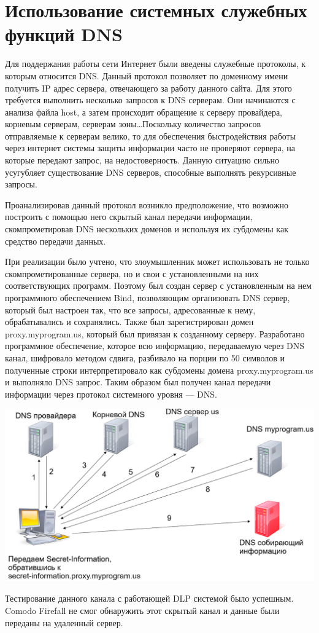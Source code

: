 \section{Использование системных служебных функций DNS}

Для поддержания работы сети Интернет были введены служебные протоколы, к которым относится DNS. Данный протокол позволяет по доменному имени получить IP адрес сервера, отвечающего за работу данного сайта. Для этого требуется выполнить несколько запросов к DNS серверам. Они начинаются с анализа файла host, а затем происходит обращение к серверу провайдера, корневым серверам, серверам зоны\dots Поскольку количество запросов отправляемые к серверам велико, то для обеспечения быстродействия работы через интернет системы защиты информации часто не проверяют сервера, на которые передают запрос, на недостоверность. Данную ситуацию сильно усугубляет существование DNS серверов, способные выполнять рекурсивные запросы. 

Проанализировав данный протокол возникло предположение, что возможно построить с помощью него скрытый канал передачи информации, скомпрометировав DNS нескольких доменов и используя их субдомены как средство передачи данных.

При реализации было учтено, что злоумышленник может использовать не только скомпрометированные сервера, но и свои с установленными на них соответствующих программ. Поэтому был создан сервер с установленным на нем программного обеспечением Bind, позволяющим организовать DNS сервер, который был настроен так, что все запросы, адресованные к нему, обрабатывались и сохранялись. Также был зарегистрирован домен proxy.myprogram.us, который был привязан к созданному серверу. Разработано программное обеспечение, которое всю информацию, передаваемую через DNS канал, шифровало методом сдвига, разбивало на порции по 50 символов и полученные строки интерпретировало как субдомены домена proxy.myprogram.us и выполняло DNS запрос. Таким образом был получен канал передачи информации через протокол системного уровня --- DNS.

\includegraphics[width=1\linewidth]{3--dns.png}

Тестирование данного канала с работающей DLP системой было успешным. Comodo Firefall не смог обнаружить этот скрытый канал и данные были переданы на удаленный сервер.
